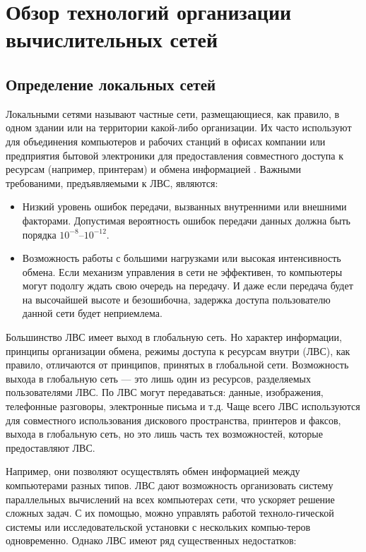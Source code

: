 \section{Обзор технологий организации вычислительных сетей}

\subsection{Определение локальных сетей}

Локальными сетями называют частные сети, размещающиеся, как правило, в одном здании или
на территории какой-либо организации. Их часто используют для объединения компьютеров и
рабочих станций в офисах компании или предприятия бытовой электроники для предоставления
совместного доступа к ресурсам (например, принтерам) и обмена информацией
\cite{tanenbaum}. Важными требованими, предъявляемыми к ЛВС, являются:

\begin{itemize}
    \item Низкий уровень ошибок передачи, вызванных внутренними или внешними факторами.
        Допустимая вероятность ошибок передачи данных должна быть порядка
        $10^{-8}$–$10^{-12}$.
    
    \item Возможность  работы  с  большими нагрузками  или высокая интенсивность обмена.
        Если механизм управления в сети не эффективен, то компьютеры могут подолгу ждать
        свою очередь на передачу. И даже если передача будет на высочайшей высоте и
        безошибочна, задержка доступа пользователю данной сети будет неприемлема.
\end{itemize}

Большинство ЛВС имеет выход в глобальную сеть. Но характер информации,  принципы
организации  обмена,  режимы  доступа  к  ресурсам внутри (ЛВС), как правило, отличаются
от принципов, принятых в глобальной сети. Возможность выхода в глобальную сеть — это
лишь один из ресурсов, разделяемых пользователями ЛВС. По ЛВС могут передаваться:
данные, изображения, телефонные разговоры, электронные письма и т.д. Чаще всего ЛВС
используются для совместного использования дискового пространства, принтеров и факсов,
выхода в глобальную сеть, но это лишь часть тех возможностей, которые предоставляют ЛВС. 

Например,  они  позволяют  осуществлять  обмен  информацией между
компьютерами  разных типов. ЛВС дают возможность организовать систему параллельных
вычислений на всех компьютерах сети, что ускоряет решение сложных задач. С их помощью,
можно управлять работой техноло-гической системы или исследовательской установки с
нескольких компью-теров одновременно. Однако ЛВС имеют ряд существенных недостатков:

